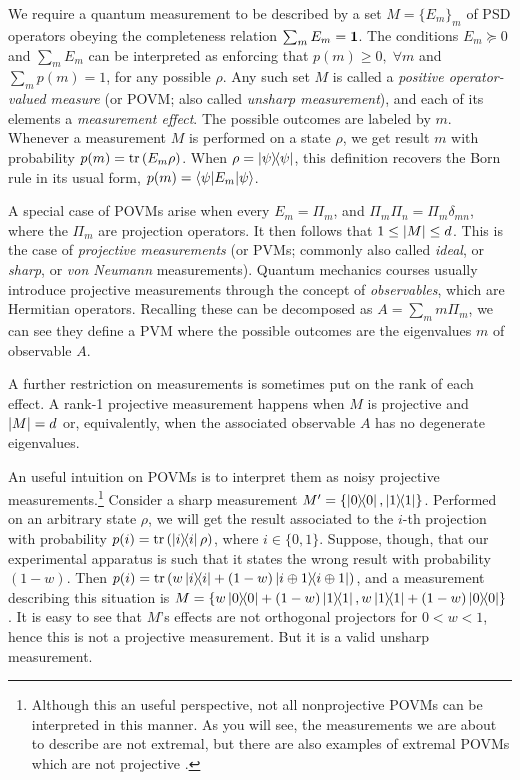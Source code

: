 		We require a quantum measurement to be described by a set $M = \{ E_m \}_m$ of PSD operators obeying the completeness relation $\sum_m E_m = \mathbf{1}$. The conditions $E_m \succeq 0$ and $\sum_m E_m$ can be interpreted as enforcing that $p(m) \geq 0, \;\forall m$ and $\sum_m p(m) = 1$, for any possible $\rho$. Any such set $M$ is called a \emph{positive operator-valued measure} (or POVM; also called \emph{unsharp measurement}), and each of its elements a \emph{measurement effect}. The possible outcomes are labeled by $m$. Whenever a measurement $M$ is performed on a state $\rho$, we get result $m$ with probability $p(m) = \text{tr}\left( E_m \rho \right)$. When $\rho = \ketbra{\psi}{\psi}$, this definition recovers the Born rule in its usual form, $p(m) = \left\langle \psi \middle\vert E_m \middle\vert \psi \right\rangle$.
		
		A special case of POVMs arise when every $E_m = \Pi_m$, and $\Pi_m \Pi_n = \Pi_m \delta_{mn}$, where the $\Pi_m$ are projection operators. It then follows that $1 \leq \abs{M} \leq d$. This is the case of \emph{projective measurements} (or PVMs; commonly also called \emph{ideal}, or \emph{sharp}, or \emph{von Neumann} measurements). Quantum mechanics courses usually introduce projective measurements through the concept of \emph{observables}, which are Hermitian operators. Recalling these can be decomposed as $A = \sum_m m \Pi_m$, we can see they define a PVM where the possible outcomes are the eigenvalues $m$ of observable $A$.
		
		A further restriction on measurements is sometimes put on the rank of each effect. A rank-1 projective measurement happens when $M$ is projective and $\abs{M} = d$ or, equivalently, when the associated observable $A$ has no degenerate eigenvalues.
		
		An useful intuition on POVMs is to interpret them as noisy projective measurements.\footnote{Although this an useful perspective, not all nonprojective POVMs can be interpreted in this manner. As you will see, the measurements we are about to describe are not extremal, but there are also examples of extremal POVMs which are not projective \cite{oszmaniec_2017_simulating}.} Consider a sharp measurement $M^\prime = \{ \ketbra{0}{0}, \ketbra{1}{1} \}$. Performed on an arbitrary state $\rho$, we will get the result associated to the $i$-th projection with probability $p(i) = \text{tr}\left( \ketbra{i}{i} \rho \right)$, where $i \in \{0, 1\}$. Suppose, though, that our experimental apparatus is such that it states the wrong result with probability $(1 - w)$. Then $p(i) = \text{tr}\left( w \ketbra{i}{i} + (1 - w) \ketbra{i \oplus1}{i \oplus 1} \right)$, and a measurement describing this situation is $M = \{ w \ketbra{0}{0} + (1 - w) \ketbra{1}{1}, w \ketbra{1}{1} + (1 - w) \ketbra{0}{0} \}$. It is easy to see that $M$'s effects are not orthogonal projectors for $0 < w < 1$, hence this is not a projective measurement. But it is a valid unsharp measurement.
		
